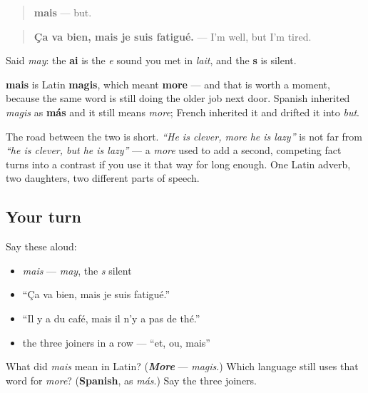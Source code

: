 \begin{cousinweb}
\begin{quote}
\textbf{mais} — but.
\end{quote}

\begin{quote}
\textbf{Ça va bien, mais je suis fatigué.} — I'm well, but I'm tired.
\end{quote}

Said \emph{may}: the \textbf{ai} is the \emph{e} sound you met in \emph{lait}, and the \textbf{s} is silent.

\textbf{mais} is Latin \textbf{magis}, which meant \textbf{more} — and that is worth a moment, because the same word is still doing the older job next door. Spanish inherited \emph{magis} as \textbf{más} and it still means \emph{more}; French inherited it and drifted it into \emph{but}.

The road between the two is short. \emph{\textquotedblleft{}He is clever, more he is lazy\textquotedblright{}} is not far from \emph{\textquotedblleft{}he is clever, but he is lazy\textquotedblright{}} — a \emph{more} used to add a second, competing fact turns into a contrast if you use it that way for long enough. One Latin adverb, two daughters, two different parts of speech.
\end{cousinweb}

\subsection*{Your turn}
Say these aloud:

\begin{itemize}
\raggedright
  \item \emph{mais} — \emph{may}, the \emph{s} silent
  \item \textquotedblleft{}Ça va bien, mais je suis fatigué.\textquotedblright{}
  \item \textquotedblleft{}Il y a du café, mais il n'y a pas de thé.\textquotedblright{}
  \item the three joiners in a row — \textquotedblleft{}et, ou, mais\textquotedblright{}
\end{itemize}

\begin{tcolorbox}[breakable,colback=teal!4,colframe=teal!35!black,title={Before you move on}]
What did \emph{mais} mean in Latin? (\emph{\textbf{More}} — \emph{magis}.) Which language still uses that word for \emph{more}? (\textbf{Spanish}, as \emph{más}.) Say the three joiners.
\end{tcolorbox}
